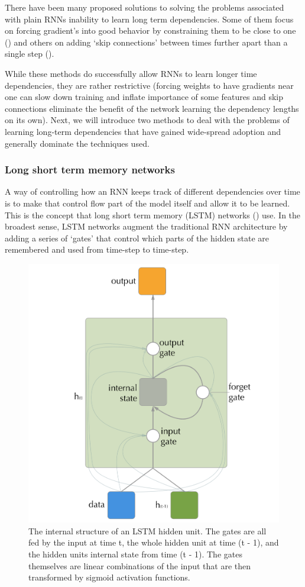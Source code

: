 \documentclass[]{book}
\theoremstyle{definition}
\theoremstyle{definition}
\theoremstyle{definition}
\theoremstyle{remark}
\begin{document}
There have been many proposed solutions to solving the problems
associated with plain RNNs inability to learn long term dependencies.
Some of them focus on forcing gradient's into good behavior by
constraining them to be close to one (\citet{bounded_gradient_rnn}) and
others on adding `skip connections' between times further apart than a
single step (\citet{skip_connections}).

While these methods do successfully allow RNNs to learn longer time
dependencies, they are rather restrictive (forcing weights to have
gradients near one can slow down training and inflate importance of some
features and skip connections eliminate the benefit of the network
learning the dependency lengths on its own). Next, we will introduce two
methods to deal with the problems of learning long-term dependencies
that have gained wide-spread adoption and generally dominate the
techniques used.

\subsubsection{Long short term memory
networks}\label{long-short-term-memory-networks}

A way of controlling how an RNN keeps track of different dependencies
over time is to make that control flow part of the model itself and
allow it to be learned. This is the concept that long short term memory
(LSTM) networks (\citet{lstm_intro}) use. In the broadest sense, LSTM
networks augment the traditional RNN architecture by adding a series of
`gates' that control which parts of the hidden state are remembered and
used from time-step to time-step.

\begin{figure}

{\centering \includegraphics[width=0.6\linewidth]{figures/lstm_cell} 

}

\caption{The internal structure of an LSTM hidden unit. The gates are all fed by the input at time t, the whole hidden unit at time (t - 1), and the hidden units internal state from time (t - 1). The gates themselves are linear combinations of the input that are then transformed by sigmoid activation functions.}\label{fig:lstmdiagram}
\end{figure}
\end{document}
